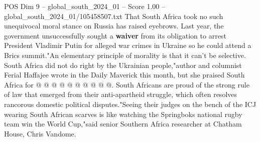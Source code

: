 \begin{textsample}{POS Dim 9 – global\_south\_2024\_01 – Score 1.00 – global\_south\_2024\_01/105458507.txt}
That South Africa took no such unequivocal moral stance on Russia has raised eyebrows.
Last year, the government unsuccessfully sought a \textbf{waiver} from its obligation to arrest President Vladimir Putin for alleged war crimes in Ukraine so he could attend a Brics summit."An elementary principle of morality is that it can't be selective.
South Africa did not do right by the Ukrainian people,"author and columnist Ferial Haffajee wrote in the Daily Maverick this month, but she praised South Africa for @ @ @ @ @ @ @ @ @ @.
South Africans are proud of the strong rule of law that emerged from their anti-apartheid struggle, which often resolves rancorous domestic political disputes."Seeing their judges on the bench of the ICJ wearing South African scarves is like watching the Springboks national rugby team win the World Cup,"said senior Southern Africa researcher at Chatham House, Chris Vandome.

\end{textsample}
